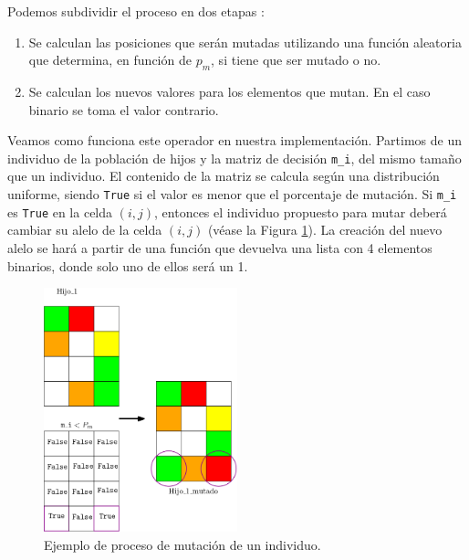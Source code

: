 \documentclass[12pt,a4paper]{book}
\begin{document}
Podemos subdividir el proceso en dos etapas \cite{e_besada_optimizacion_nodate}: 

	\begin{enumerate}
		\item Se calculan las posiciones que serán mutadas utilizando una función aleatoria que determina, en función de $p_m$, si tiene que ser mutado o no.
		\item Se calculan los nuevos valores para los elementos que mutan. En el caso binario se toma el valor contrario.  
	\end{enumerate}

Veamos como funciona este operador en nuestra implementación. Partimos de un individuo de la población de hijos y la {matriz de decisión} \texttt{m\_i}, del mismo tamaño que un individuo. El contenido de la matriz se calcula según una distribución uniforme, siendo \texttt{True} si el valor es menor que el porcentaje de mutación. Si \texttt{m\_i} es \texttt{True} en la celda $(i,j)$, entonces el individuo propuesto para mutar deberá cambiar su alelo de la celda $(i,j)$ (véase la Figura \ref{fig:mutacion_ej}). La creación del nuevo alelo se hará a partir de una función que devuelva una lista con 4 elementos binarios, donde solo uno de ellos será un 1.  

	\begin{figure}[H] 
    	\begin{center}
    	\includegraphics[width=0.5\textwidth]{img/ej_mutacion.png}
    	\end{center}
    	\caption{Ejemplo de proceso de mutación de un individuo.}
    	\label{fig:mutacion_ej}
	\end{figure}

\end{document}
